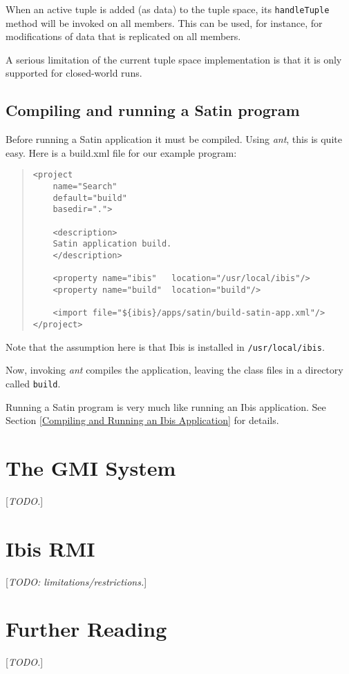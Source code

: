 \documentclass[10pt]{article}
\newcommand{\mysection}[1]{\section{#1}\label{#1}}
\newcommand{\mysubsection}[1]{\subsection{#1}\label{#1}}
\newcommand{\remark}[1]{[\emph{#1}]}
\begin{document}
When an active tuple is added (as data) to the tuple space,
its \verb+handleTuple+ method will be invoked on all members.
This can be used, for instance, for modifications of data that
is replicated on all members.

A serious limitation of the current tuple space implementation is that
it is only supported for closed-world runs.

\mysubsection{Compiling and running a Satin program}

Before running a Satin application it must be compiled.
Using \emph{ant}, this is quite easy. Here is a build.xml file for
our example program:

\begin{quote}
\begin{verbatim}
<project
    name="Search"
    default="build"
    basedir=".">

    <description>
    Satin application build.
    </description>

    <property name="ibis"   location="/usr/local/ibis"/>
    <property name="build"  location="build"/>

    <import file="${ibis}/apps/satin/build-satin-app.xml"/>
</project>
\end{verbatim}
\end{quote}
Note that the assumption here is that Ibis is installed in
\verb+/usr/local/ibis+.

Now, invoking \emph{ant} compiles the application, leaving the class files
in a directory called \verb+build+.

Running a Satin program is very much like running an Ibis application.
See Section \ref{Compiling and Running an Ibis Application} for details.

\mysection{The GMI System}

\remark{TODO.}

\mysection{Ibis RMI}

\remark{TODO: limitations/restrictions.}

\mysection{Further Reading}

\remark{TODO.}
\end{document}
